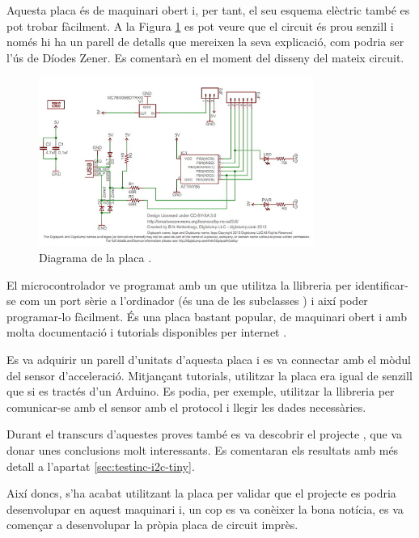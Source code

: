 Aquesta placa és de maquinari obert i, per tant, el seu esquema elèctric també 
es pot trobar fàcilment. A la Figura \ref{fig:digisparksch} es pot veure que
el circuit és prou senzill i només hi ha un parell de detalls que mereixen
la seva explicació, com podria ser l'ús de Díodes Zener. Es comentarà en el
moment del disseny del mateix circuit.

\begin{figure}[ht]
    \centering
    \includegraphics[width=0.8\textwidth]{images/modules/digisparksch.jpg}
    \caption{Diagrama de la placa  \cite{Digispark}.}
    \label{fig:digisparksch}
\end{figure}

El microcontrolador ve programat amb un  que utilitza la
llibreria  per identificar-se com un port sèrie a l'ordinador
(és una de les subclasses ) i així poder programar-lo fàcilment.
És una placa bastant popular, de maquinari obert i amb molta documentació i
tutorials disponibles per internet \cite{DigisparkBootloader}.

Es va adquirir un parell d'unitats d'aquesta placa i es va connectar amb el
mòdul del sensor d'acceleració. Mitjançant tutorials, utilitzar la placa
  era igual de senzill que si es tractés d'un Arduino. Es podia, 
per exemple, utilitzar la llibreria  per comunicar-se amb el sensor
amb el protocol  i llegir les dades necessàries.

Durant el transcurs d'aquestes proves també es va descobrir el projecte
, que va donar unes conclusions molt interessants. Es
comentaran els resultats amb més detall a l'apartat \ref{sec:testinc-i2c-tiny}.

Així doncs, s'ha acabat utilitzant la placa  per validar
que el projecte es podria desenvolupar en aquest maquinari i, un cop es va
conèixer la bona notícia, es va començar a desenvolupar la pròpia placa de circuit
imprès.

